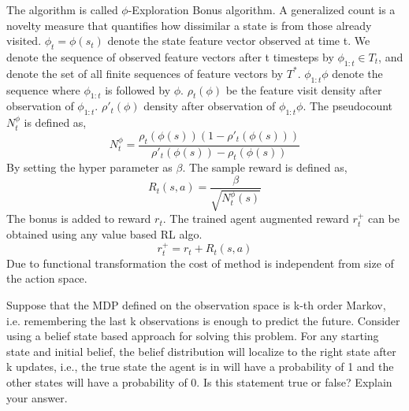 \documentclass[solution,addpoints,12pt]{exam}
\begin{document}
\begin{questions}
\begin{solution}
The algorithm is called $\phi$-Exploration Bonus algorithm. A generalized count is a novelty measure that quantifies how dissimilar a state is from those already visited. $\phi_t = \phi(s_t)$ denote the state feature vector observed at time t. We denote the sequence of observed feature vectors after t timesteps by $\phi_{1:t}\in T_t$, and denote the set of all finite sequences of feature vectors by $T^*$. $\phi_{1:t}\phi$ denote the sequence where $\phi_{1:t}$ is followed by $\phi$. 
$\rho_t(\phi)$ be the feature visit density after observation of $\phi_{1:t}$. $\rho'_t(\phi)$ density after observation of $\phi_{1:t}\phi$. The pseudocount $N_t^\phi$ is defined as,
\begin{equation}
	N^\phi_t = \frac{\rho_t(\phi(s))(1-\rho'_t(\phi(s)))}{\rho'_t(\phi(s))-\rho_t(\phi(s))}
\end{equation}
By setting the hyper parameter as $\beta$.  The sample reward is defined as,
\begin{equation}
R_t(s,a) = \frac{\beta}{\sqrt{N^\phi_t(s)}}
\end{equation} 
The bonus is added to reward $r_t$. The trained agent augmented reward $r^+_t$ can be obtained using any value based RL algo.
\begin{equation}
r^+_t = r_t + R_t(s,a)
\end{equation}  Due to functional transformation the cost of method is independent from size of the action space.
\end{solution}
\question[5] Suppose that the MDP defined on the observation space is k-th order Markov, i.e. remembering the last k observations is enough to predict the future. 
Consider using a belief state based approach for solving this problem. For any starting state and initial belief, the belief distribution will localize to the right state after k updates, i.e., the true state the agent is in will have a probability of 1 and the other states will have a probability of 0. Is this statement true or false? Explain your answer. 


\end{questions}
\end{document}
